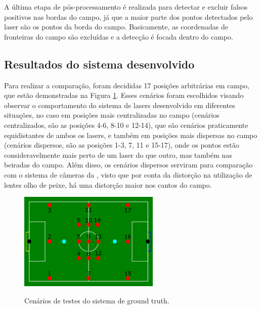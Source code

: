 \documentclass[acronym, symbols, table, deposito]{fei}
\begin{document}
				A última etapa de pós-processamento é realizada para detectar e excluir falsos positivos nas bordas do campo, já que a maior parte dos pontos detectados pelo laser são os pontos da borda do campo. Basicamente, as coordenadas de fronteiras do campo são excluídas e a detecção é focada dentro do campo.
		
			\subsection{Resultados do sistema desenvolvido}
		
				Para realizar a comparação, foram decididas 17 posições arbitrárias em campo, que estão demonstradas na Figura \ref{fig:cenarios_testes_ground_truth}. Esses cenários foram escolhidos visando observar o comportamento do sistema de lasers desenvolvido em diferentes situações, no caso em posições mais centralizadas no campo (cenários centralizados, são as posições 4-6, 8-10 e 12-14), que são cenários praticamente equidistantes de ambos os lasers, e também em posições mais dispersas no campo (cenários dispersos, são as posições 1-3, 7, 11 e 15-17), onde os pontos estão consideravelmente mais perto de um laser do que outro, mas também nas beiradas do campo. Além disso, os cenários dispersos serviram para comparação com o sistema de câmeras da , visto que por conta da distorção na utilização de lentes olho de peixe, há uma distorção maior nos cantos do campo.
				
				\begin{figure}[!htb]
					\centering
					\caption{Cenários de testes do sistema de ground truth.}
					\includegraphics[width=0.6\textwidth]{cenarios_testes.png}
					\label{fig:cenarios_testes_ground_truth}
				\end{figure}
			
\end{document}
